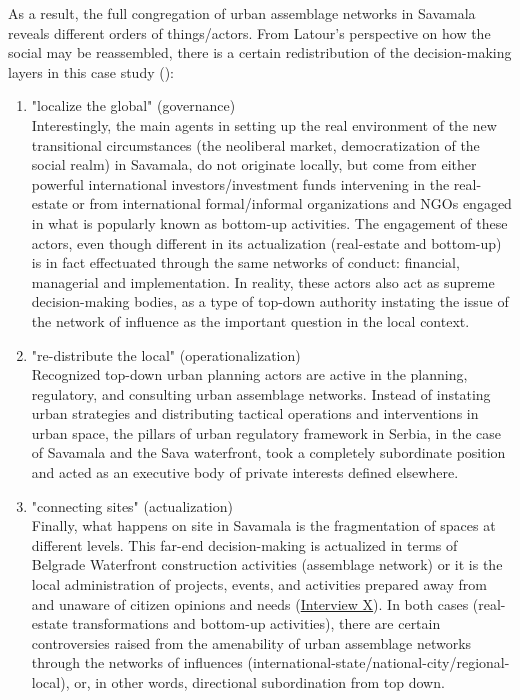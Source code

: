\documentclass[11pt]{report}
\begin{document}
As a result, the full congregation of urban assemblage networks in Savamala reveals different orders of things/actors. From Latour’s perspective on how the social may be reassembled, there is a certain redistribution of the decision-making layers in this case study (\href{Latour}{\citealt{latour_reassembling_2005}}):

\begin{enumerate}
\item "localize the global" (governance)
\\
Interestingly, the main agents in setting up the real environment of the new transitional circumstances (the neoliberal market, democratization of the social realm) in Savamala, do not originate locally, but come from either powerful international investors/investment funds intervening in the real-estate or from international formal/informal organizations and NGOs engaged in what is popularly known as bottom-up activities. The engagement of these actors, even though different in its actualization (real-estate and bottom-up) is in fact effectuated through the same networks of conduct: financial, managerial and implementation. In reality, these actors also act as supreme decision-making bodies, as a type of top-down authority instating the issue of the network of influence as the important question in the local context. 

\item "re-distribute the local" (operationalization)
\\
Recognized top-down urban planning actors are active in the planning, regulatory, and consulting urban assemblage networks. Instead of instating urban strategies and distributing tactical operations and interventions in urban space, the pillars of urban regulatory framework in Serbia, in the case of Savamala and the Sava waterfront, took a completely subordinate position and acted as an executive body of private interests defined elsewhere.

\item "connecting sites" (actualization)
\\
Finally, what happens on site in Savamala is the fragmentation of spaces at different levels. This far-end decision-making is actualized in terms of Belgrade Waterfront construction activities (assemblage network) or it is the local administration of projects, events, and activities prepared away from and unaware of citizen opinions and needs (\href{InterviewX}{Interview X}).
In both cases (real-estate transformations and bottom-up activities), there are certain controversies raised from the amenability of urban assemblage networks through the networks of influences (international-state/national-city/regional-local), or, in other words, directional subordination from top down.
\end{enumerate}
\end{document}
